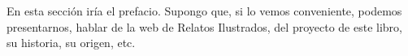 En esta sección iría el prefacio. Supongo que, si lo vemos conveniente, podemos presentarnos, hablar de la web de Relatos Ilustrados, del proyecto de este libro, su historia, su origen, etc.